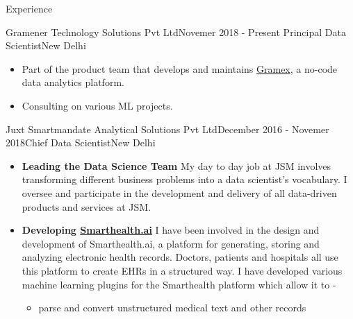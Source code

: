\documentclass{resume} %
\begin{document}

% 
% 


\begin{rSection}{Experience}
    \begin{rSubsection}{Gramener Technology Solutions Pvt Ltd}{Novemer 2018 - Present}
        {Principal Data Scientist}{New Delhi}
	    \begin{itemize}
		    \item Part of the product team that develops and maintains
			    \href{https://github.com/gramener/gramex}{Gramex}, a no-code data analytics platform.
		    \item Consulting on various ML projects.
	    \end{itemize}
    \end{rSubsection}
	\begin{rSubsection}{Juxt Smartmandate Analytical Solutions Pvt Ltd}{December
	    2016 - Novemer 2018}{Chief Data Scientist}{New Delhi}
		\begin{itemize}
		    \item \textbf{Leading the Data Science Team} My day to day job at JSM
			involves transforming different business problems into a data
			scientist’s vocabulary. I oversee and participate in the development
			and delivery of all data-driven products and services at JSM.
		    \item \textbf{Developing \href{http://smarthealth.ai}{Smarthealth.ai}} I
			have been involved in the design and development of Smarthealth.ai, a
			platform for generating, storing and analyzing electronic health
			records. Doctors, patients and hospitals all use this platform to
			create EHRs in a structured way. I have developed various machine
			learning plugins for the Smarthealth platform which allow it to -
			\begin{itemize}
			    \item parse and convert unstructured medical text and other records

\end{itemize}
\end{itemize}
\end{rSubsection}
\end{rSection}
\end{document}
